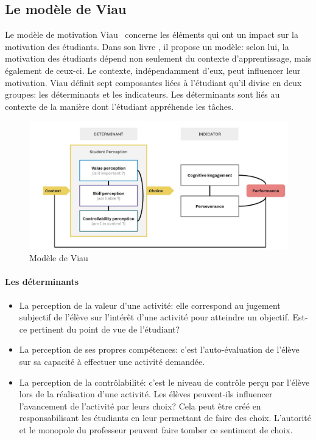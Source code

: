    \subsection{Le modèle de Viau}\label{sec:viau}
        Le modèle de motivation Viau~ concerne les éléments qui ont un impact sur la motivation des étudiants.
        Dans son livre  , il propose un modèle: selon lui, la motivation des étudiants dépend non seulement du contexte d'apprentissage, mais également de ceux-ci. Le contexte, indépendamment d’eux, peut influencer leur motivation. %
        Viau définit sept composantes liées à l'étudiant qu'il divise en deux groupes: les déterminants et les indicateurs. Les déterminants sont liés au contexte de la manière dont l'étudiant appréhende les tâches.
        \begin{figure}[!h]
            \centering
            \label{fig:ViauModel}\includegraphics[width=0.9\linewidth]{Figures/ViauModel.png}
            \caption{Modèle de Viau~}
        \end{figure}\par%
        \paragraph{Les déterminants}
            \begin{itemize}\myItemStyle
            \item La perception de la valeur d'une activité: elle correspond au jugement subjectif de l'élève sur l'intérêt d'une activité pour atteindre un objectif. Est-ce pertinent du point de vue de l'étudiant?
            \item La perception de ses propres compétences: c'est l'auto-évaluation de l'élève sur sa capacité à effectuer une activité demandée.
            \item La perception de la contrôlabilité: c'est le niveau de contrôle perçu par l’élève lors de la réalisation d'une activité. Les élèves peuvent-ils influencer l'avancement de l'activité par leurs choix? Cela peut être créé en responsabilisant les étudiants en leur permettant de faire des choix. L'autorité et le monopole du professeur peuvent faire tomber ce sentiment de choix.
            \end{itemize}\par%
